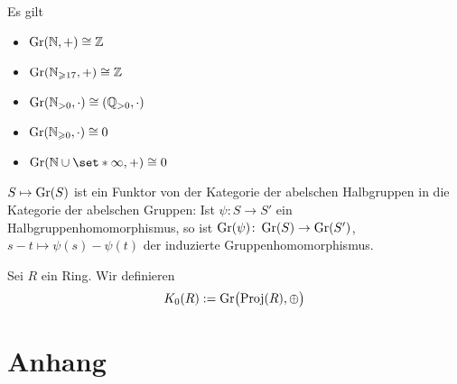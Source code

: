 \begin{beispiel}[{name=[{für Grothendiek-Konstruktionen}]}]
	Es gilt
	\begin{multicols}{2}
		\begin{itemize}
			\item $\Gr(\mathbb{N},+) \cong \mathbb{Z}$
			\item $\Gr(\mathbb{N}_{\ge 17},+) \cong \mathbb{Z}$
			\item $\Gr(\mathbb{N}_{>0},\cdot ) \cong (\mathbb{Q}_{>0},\cdot )$
			\item $\Gr(\mathbb{N}_{\ge 0},\cdot) \cong 0$
			\item $\Gr(\mathbb{N} \cup \set*{\infty},+) \cong 0$
		\end{itemize}
	\end{multicols}
\end{beispiel}

\begin{bemerkung}[{name=[{Funktorialität}]}]
	$S \mapsto \Gr(S)$ ist ein Funktor von der Kategorie der abelschen Halbgruppen in die Kategorie der abelschen Gruppen:
	Ist $\psi \colon S \to S'$ ein Halbgruppenhomomorphismus, so ist $\Gr(\psi) \colon \Gr(S) \to \Gr(S')$, $s-t \mapsto \psi(s) - \psi(t)$ der induzierte Gruppenhomomorphismus.
\end{bemerkung}

\begin{definition}[{name=[{$K_0$ von Ringen}]}]
	Sei $R$ ein Ring. 
	Wir definieren
	\[
		K_0(R) := \Gr \enbrace[\big]{\Proj(R),\oplus }
	\]
\end{definition}

\cleardoubleoddemptypage
{}
\setcounter{page}{1}
\cleardoubleoddemptypage
\appendix

\section{Anhang} %
\label{sec:anhang}

\printindex
\printbibliography
\listoffigures
\todototoc
{}

